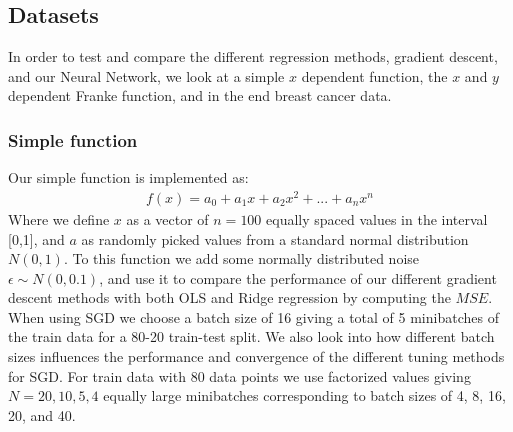 \documentclass[11pt]{article}
\begin{document}
\subsection{Datasets}
In order to test and compare the different regression methods, gradient descent, and our Neural Network, we look at a simple $x$ dependent function, the $x$ and $y$ dependent Franke function, and in the end breast cancer data.

\subsubsection*{Simple function}
Our simple function is implemented as:
\begin{align*}
    f(x) = a_0 + a_1 x + a_2 x^2 + ... + a_n x^n
\end{align*}
Where we define $x$ as a vector of $n=100$ equally spaced values in the interval [0,1], and $a$ as randomly picked values from a standard normal distribution $N(0,1)$.
To this function we add some normally distributed noise $\epsilon\sim N(0,0.1)$, and use it to compare the performance of our different gradient descent methods  with both OLS and Ridge regression by computing the $MSE$. When using SGD we choose a batch size of 16 giving a total of 5 minibatches of the train data for a 80-20 train-test split. We also look into how different batch sizes influences the performance and convergence of the different tuning methods for SGD. For train data with 80 data points we use factorized values giving $N=20, 10, 5, 4$ equally large minibatches corresponding to batch sizes of 4, 8, 16, 20, and 40.
\end{document}
